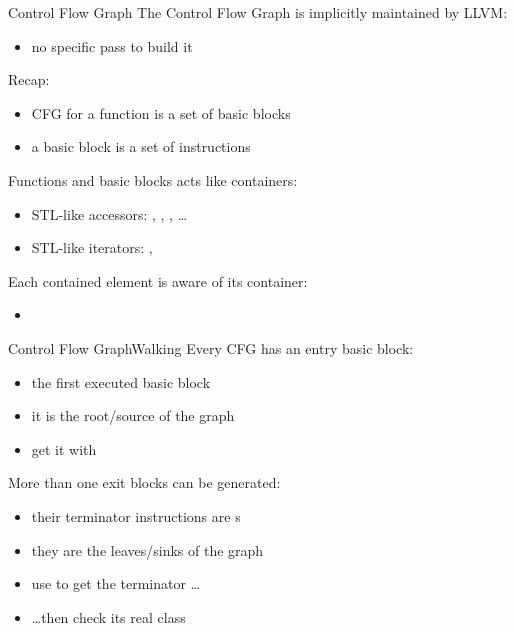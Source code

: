 \begin{frame}{Control Flow Graph}
The Control Flow Graph is implicitly maintained by LLVM:

\begin{itemize}
\item no specific pass to build it
\end{itemize}

\vfill
Recap:

\begin{itemize}
\item CFG for a function is a set of basic blocks
\item a basic block is a set of instructions
\end{itemize}

\vfill
Functions and basic blocks acts like containers:

\begin{itemize}
\item STL-like accessors: , ,
      , \ldots
\item STL-like iterators: , 
\end{itemize}

\vfill
Each contained element is aware of its container:

\begin{itemize}
\item {}
\end{itemize}
\end{frame}

\begin{frame}{Control Flow Graph}{Walking}
Every CFG has an entry basic block:

\begin{itemize}
\item the \alert{first} executed basic block
\item it is the \alert{root/source} of the graph
\item get it with 
\end{itemize}

\vfill
More than one exit blocks can be generated:

\begin{itemize}
\item their terminator instructions are s
\item they are the \alert{leaves/sinks} of the graph
\item use  to get the terminator
      \ldots
\item \ldots then check its real class
\end{itemize}
\end{frame}

